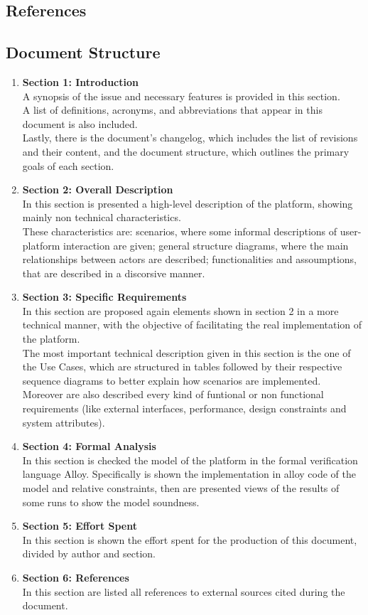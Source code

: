\subsection{References}

\subsection{Document Structure}
\begin{enumerate}[label=$\bullet$]
    \item \textbf{Section 1: Introduction}\\
    A synopsis of the issue and necessary features is provided in this section.\\
    A list of definitions, acronyms, and abbreviations that appear in this document is also included.\\
    Lastly, there is the document's changelog, which includes the list of revisions and their content, and the document structure, which outlines the primary goals of each section.
    \item \textbf{Section 2: Overall Description}\\
    In this section is presented a high-level description of the platform, showing mainly non technical characteristics.\\
    These characteristics are: 
    scenarios, where some informal descriptions of user-platform interaction are given; 
    general structure diagrams, where the main relationships between actors are described; 
    functionalities and assoumptions, that are described in a discorsive manner.\\
    \item \textbf{Section 3: Specific Requirements}\\
    In this section are proposed again elements shown in section 2 in a more technical manner, with the objective of facilitating the real implementation of the platform.\\
    The most important technical description given in this section is the one of the Use Cases, which are structured in tables followed by their respective sequence diagrams to better explain how scenarios are implemented.\\
    Moreover are also described every kind of funtional or non functional requirements (like external interfaces, performance, design constraints and system attributes).
    \item \textbf{Section 4: Formal Analysis}\\
    In this section is checked the model of the platform in the formal verification language Alloy.
    Specifically is shown the implementation in alloy code of the model and relative constraints, then are presented views of the results of some runs to show the model soundness.
    \item \textbf{Section 5: Effort Spent}\\
    In this section is shown the effort spent for the production of this document, divided by author and section.
    \item \textbf{Section 6: References}\\
    In this section are listed all references to external sources cited during the document.


\end{enumerate}

\newpage
